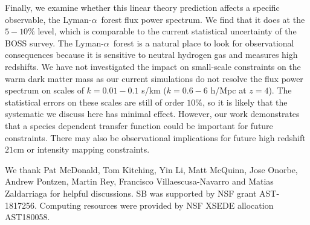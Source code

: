 \documentclass[a4paper,11pt]{article}
\newcommand{\Lya}{Lyman-$\alpha$}
\begin{document}
Finally, we examine whether this linear theory prediction affects a specific observable, the \Lya~forest flux power spectrum. We find that it does at the $5-10\%$ level, which is comparable to the current statistical uncertainty of the BOSS survey. The \Lya~forest is a natural place to look for observational consequences because it is sensitive to neutral hydrogen gas and measures high redshifts.
We have not investigated the impact on small-scale constraints on the warm dark matter mass \cite{Irsic:2017} as our current simulations do not resolve the flux power spectrum on scales of $k = 0.01 - 0.1$ s/km ($k = 0.6 - 6$ h/Mpc at $z = 4$). The statistical errors on these scales are still of order $10\%$, so it is likely that the systematic we discuss here has minimal effect. However, our work demonstrates that a species dependent transfer function could be important for future constraints. There may also be observational implications for future high redshift $21$cm or intensity mapping constraints.


\acknowledgments

We thank Pat McDonald, Tom Kitching, Yin Li, Matt McQuinn, Jose Onorbe, Andrew Pontzen, Martin Rey, Francisco Villaescusa-Navarro and Matias Zaldarriaga for helpful discussions. SB was supported by NSF grant AST-1817256. Computing resources were provided by NSF XSEDE allocation AST180058.



\end{document}
